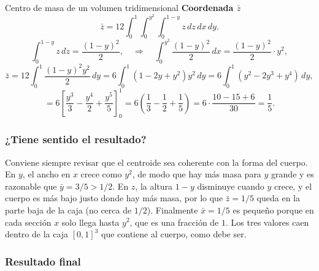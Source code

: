 \begin{solucion}{Centro de masa de un volumen tridimensional}
\textbf{Coordenada $\bar{z}$}\\
\[
\bar{z} = 12 \int_0^1 \int_0^{y^2} \int_0^{1 - y} z\,dz\,dx\,dy.
\]
\[
\int_0^{1 - y} z\,dz = \frac{(1 - y)^2}{2},
\quad \Rightarrow \quad
\int_0^{y^2} \frac{(1 - y)^2}{2}\,dx = \frac{(1 - y)^2}{2} \cdot y^2,
\]
\[
\bar{z} = 12 \int_0^1 \frac{(1 - y)^2 y^2}{2}\,dy = 6 \int_0^1 (1 - 2y + y^2)y^2\,dy = 6 \int_0^1 (y^2 - 2y^3 + y^4)\,dy,
\]
\[
= 6 \left[ \frac{y^3}{3} - \frac{y^4}{2} + \frac{y^5}{5} \right]_0^1
= 6 \left( \frac{1}{3} - \frac{1}{2} + \frac{1}{5} \right)
= 6 \cdot \frac{10 - 15 + 6}{30} = \frac{1}{5}.
\]

\subsubsection*{¿Tiene sentido el resultado?}

Conviene siempre revisar que el centroide sea coherente con la forma del cuerpo. En $y$, el ancho en $x$ crece como $y^2$, de modo que hay más masa para $y$ grande y es razonable que $\bar y=3/5>1/2$. En $z$, la altura $1-y$ disminuye cuando $y$ crece, y el cuerpo es más bajo justo donde hay más masa, por lo que $\bar z=1/5$ queda en la parte baja de la caja (no cerca de $1/2$). Finalmente $\bar x=1/5$ es pequeño porque en cada sección $x$ solo llega hasta $y^2$, que es una fracción de $1$. Los tres valores caen dentro de la caja $[0,1]^3$ que contiene al cuerpo, como debe ser.

\subsubsection*{Resultado final}


\end{solucion}
